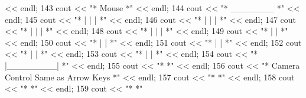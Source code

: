 \begin{DoxyCode}
      << endl;
143         cout << \textcolor{stringliteral}{"*                                      Mouse                                           *"} 
      << endl;
144         cout << \textcolor{stringliteral}{"*                                     \_\_\_\_\_\_\_                                          *"} 
      << endl;
145         cout << \textcolor{stringliteral}{"*                                    |    |   |                                        *"} 
      << endl;
146         cout << \textcolor{stringliteral}{"*                                   |     |    |                                       *"} 
      << endl;
147         cout << \textcolor{stringliteral}{"*                                  |      |     |                                      *"} 
      << endl;
148         cout << \textcolor{stringliteral}{"*                                  |      |     |                                      *"} 
      << endl;
149         cout << \textcolor{stringliteral}{"*                                 |              |                                     *"} 
      << endl;
150         cout << \textcolor{stringliteral}{"*                                 |              |                                     *"} 
      << endl;
151         cout << \textcolor{stringliteral}{"*                                 |              |                                     *"} 
      << endl;
152         cout << \textcolor{stringliteral}{"*                                  |            |                                      *"} 
      << endl;
153         cout << \textcolor{stringliteral}{"*                                   |          |                                       *"} 
      << endl;
154         cout << \textcolor{stringliteral}{"*                                    |\_\_\_\_\_\_\_\_|                                        *"} 
      << endl;
155         cout << \textcolor{stringliteral}{"*                                                                                      *"} 
      << endl;
156         cout << \textcolor{stringliteral}{"*                          Camera Control Same as Arrow Keys                           *"} 
      << endl;
157         cout << \textcolor{stringliteral}{"*                                                                                      *"} 
      << endl;
158         cout << \textcolor{stringliteral}{"*                                                                                      *"} 
      << endl;
159         cout << \textcolor{stringliteral}{"*                                                                                      *"} 

\end{DoxyCode}
